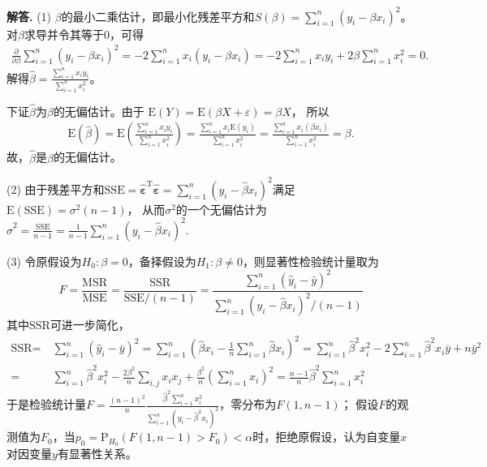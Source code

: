 \documentclass[12pt, a4paper, oneside]{ctexart}
\newenvironment{solution}[1][]{\par\noindent\textbf{#1解答. }}{\smallskip\par}  %
\def\bd{\boldsymbol}        %
\def\E{\textrm{E}}          %
\def\T{\textrm{T}}          %
\def\P{\textrm{P}}          %
\def\add{\vspace{1ex}}      %
\begin{document}
\begin{solution}
    (1)  $\beta$的最小二乘估计，即最小化残差平方和$S(\beta) = \sum_{i=1}^n (y_i-\beta x_i)^2$。
    对$\beta$求导并令其等于0，可得
    \begin{align*}
        \frac{\partial}{\partial \beta}\sum_{i=1}^n (y_i-\beta x_i)^2 = -2\sum_{i=1}^n x_i(y_i-\beta x_i)
        = -2\sum_{i=1}^n x_i y_i + 2\beta\sum_{i=1}^n x_i^2 = 0.
    \end{align*}
    解得$\hat{\beta}=\frac{\sum_{i=1}^n x_i y_i}{\sum_{i=1}^n x_i^2}$。\add

    下证$\hat{\beta}$为$\beta$的无偏估计。由于
    $\E(Y)=\E(\beta X+\varepsilon)=\beta X$，
    所以
    \begin{align*}
        \E(\hat{\beta})
        = \E\left(\frac{\sum_{i=1}^n x_i y_i}{\sum_{i=1}^n x_i^2}\right) 
        = \frac{\sum_{i=1}^n x_i \E(y_i)}{\sum_{i=1}^n x_i^2} 
        = \frac{\sum_{i=1}^n x_i (\beta x_i)}{\sum_{i=1}^n x_i^2} 
        = \beta.
    \end{align*} 故，$\hat{\beta}$是$\beta$的无偏估计。

    (2) 
    由于残差平方和$\text{SSE}=\hat{\bd{\varepsilon}}^{\T}\hat{\bd{\varepsilon}}=\sum_{i=1}^n (y_i-\hat{\beta}x_i)^2$满足$\E(\text{SSE}) = \sigma^2(n-1)$，
    从而$\sigma^2$的一个无偏估计为$\hat{\sigma}^2 = \frac{\text{SSE}}{n-1} = \frac{1}{n-1}\sum_{i=1}^n (y_i-\hat{\beta}x_i)^2$.

    (3) 令原假设为$H_0:\beta=0$，备择假设为$H_1:\beta\neq 0$，则显著性检验统计量取为
    \begin{equation*}
        F = \frac{\text{MSR}}{\text{MSE}} = \frac{\text{SSR}}{\text{SSE}/(n-1)} = \frac{\sum_{i=1}^n(\hat{y}_i - \bar{y})^2}{\sum_{i=1}^n(y_i-\hat{\beta}x_i)^2/(n-1)}
    \end{equation*}
    其中$\text{SSR}$可进一步简化，
    \begin{align*}
        \text{SSR} =&\ \sum_{i=1}^n(\hat{y}_i-\bar{y})^2 = \sum_{i=1}^n\left(\hat{\beta} x_i - \frac{1}{n}\sum_{i=1}^n\hat{\beta} x_i\right)^2 = \sum_{i=1}^n\hat{\beta}^2x_i^2 - 2\sum_{i=1}^n\hat{\beta}^2x_i\bar{y} + n\bar{y}^2\\
        =&\ \sum_{i=1}^n\hat{\beta}^2x_i^2 - \frac{2\beta^2}{n}\sum_{i,j}x_ix_j + \frac{\beta^2}{n}\left(\sum_{i=1}^nx_i\right)^2 = \frac{n-1}{n}\hat{\beta}^2\sum_{i=1}^nx_i^2
    \end{align*}
    于是检验统计量\add $F = \frac{(n-1)^2}{n}\frac{\hat{\beta}^2\sum_{i=1}^nx_i^2}{\sum_{i=1}^n(y_i-\hat{\beta}^2x_i)^2}$，零分布为$F(1,n-1)$；
    假设$F$的观测值为$F_0$，当$p_0 = \P_{H_0}(F(1,n-1)> F_0) < \alpha$时，拒绝原假设，认为自变量$x$对因变量$y$有显著性关系。


\end{solution}
\end{document}
